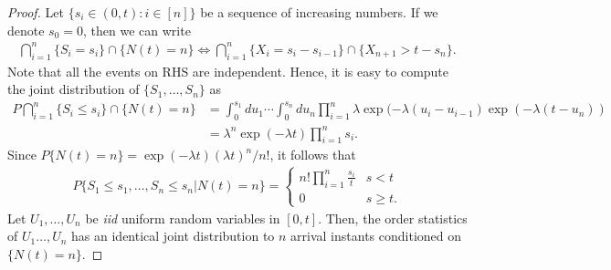 \documentclass[a4paper,10pt,english]{article}
\begin{document}
\begin{proof} 
Let $\{ s_i \in (0, t) : i \in [n]\}$ be a sequence of increasing numbers. If we denote $s_{0} = 0$, then we can write 
\begin{align*}
\bigcap_{i=1}^n\{S_i = s_i\}\cap\{N(t) = n\} \iff \bigcap_{i=1}^n\{X_i = s_i - s_{i-1}\}\cap\{X_{n+1} > t - s_n\}.
\end{align*}
Note that all the events on RHS are independent. 
Hence, it is easy to compute the joint distribution of $\{S_1,\ldots, S_n\}$ as 
\begin{align*}
P\bigcap_{i=1}^n\{S_i \leq s_i\}\cap\{N(t) = n\} &= \int_{0}^{s_1}du_1\cdots\int_{0}^{s_n}du_n \prod_{i=1}^n\lambda \exp(-\lambda (u_i-u_{i-1})\exp(-\lambda (t-u_n))\\
&= \lambda^n\exp(-\lambda t)\prod_{i=1}^ns_i.
\end{align*}
Since $P\{N(t) = n\} = \exp(-\lambda t)(\lambda t)^n/n! $, it follows that 
\begin{align*}
P\{S_1 \leq s_1,\ldots, S_n\leq s_n | N(t) = n\} = 
\begin{cases}
n!\prod_{i=1}^n\frac{s_i}{t} & s < t\\ 
0 & s \geq t.
\end{cases}
\end{align*}
Let $U_{1},\ldots,U_{n}$ be \textit{iid} uniform random variables in $[0,t]$. Then, the order statistics  of $U_1 \ldots, U_n$ has an identical joint distribution to $n$ arrival instants conditioned on $\{N(t)=n\}$.\end{proof}
\end{document}
